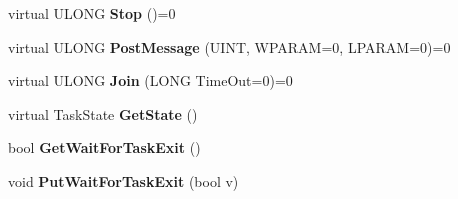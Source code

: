 \begin{DoxyCompactItemize}
virtual U\+L\+O\+NG {\bfseries Stop} ()=0
\item 
\mbox{\label{class_canberra_1_1_utility_1_1_core_1_1_task_a4dd3813fb31b17409e50a5bc6c603dc3}} 
virtual U\+L\+O\+NG {\bfseries Post\+Message} (U\+I\+NT, W\+P\+A\+R\+AM=0, L\+P\+A\+R\+AM=0)=0
\item 
\mbox{\label{class_canberra_1_1_utility_1_1_core_1_1_task_a66cb7532efb005c7b779f4eb98188f26}} 
virtual U\+L\+O\+NG {\bfseries Join} (L\+O\+NG Time\+Out=0)=0
\item 
\mbox{\label{class_canberra_1_1_utility_1_1_core_1_1_task_a0c6eb0d8f9e14a5f8409216c561c028c}} 
virtual Task\+State {\bfseries Get\+State} ()
\item 
\mbox{\label{class_canberra_1_1_utility_1_1_core_1_1_task_a46f5b46e52bb7339f9407f2b2df58d56}} 
bool {\bfseries Get\+Wait\+For\+Task\+Exit} ()
\item 
\mbox{\label{class_canberra_1_1_utility_1_1_core_1_1_task_a4ab5337159e3292f1986f5cb41a41b3a}} 
void {\bfseries Put\+Wait\+For\+Task\+Exit} (bool v)
\end{DoxyCompactItemize}
